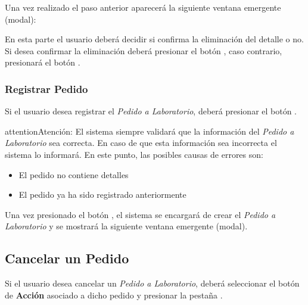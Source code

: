 \documentclass[a4paper,10pt,spanish]{sphinxmanual}
\begin{document}
Una vez realizado el paso anterior aparecerá la siguiente ventana emergente (modal):


En esta parte el usuario deberá decidir si confirma la eliminación del detalle o no. Si desea confirmar la eliminación deberá presionar el botón , caso contrario, presionará el botón .


\subsubsection{Registrar Pedido}
\label{pedidosalab:registrar-pedido-pl}\label{pedidosalab:registrar-pedido}
Si el usuario desea registrar el \emph{Pedido a Laboratorio}, deberá presionar el botón .


\begin{notice}{attention}{Atención:}
El sistema siempre validará que la información del \emph{Pedido a Laboratorio} sea correcta. En caso de que esta información sea incorrecta el sistema lo informará.
En este punto, las posibles causas de errores son:
\begin{itemize}
\item {} 
El pedido no contiene detalles

\item {} 
El pedido ya ha sido registrado anteriormente

\end{itemize}
\end{notice}

Una vez presionado el botón , el sistema se encargará de crear el \emph{Pedido a Laboratorio} y se mostrará la siguiente ventana emergente (modal).



\subsection{Cancelar un Pedido}
\label{pedidosalab:cancelar-un-pedido}\label{pedidosalab:cancelar-pedido-pl}
Si el usuario desea cancelar un \emph{Pedido a Laboratorio}, deberá seleccionar el botón de \textbf{Acción} asociado a dicho pedido y presionar la pestaña .
\end{document}
